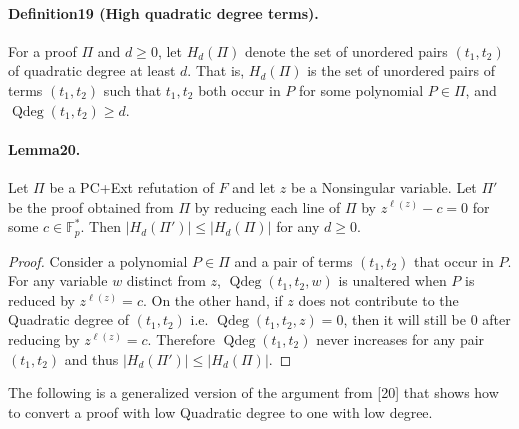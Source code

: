 \documentclass[10pt,a4paper]{article}
\DeclareMathOperator{\Qdeg}{Qdeg}
\begin{document}
\paragraph{Definition19 (High quadratic degree terms).} For a proof $\Pi$ and $d\geq0$, let $H_d(\Pi)$ denote the set of unordered pairs $(t_1,t_2)$ of quadratic degree at least $d$. That is, $H_d(\Pi)$ is the set of unordered pairs of terms $(t_1,t_2)$ such that $t_1,t_2$ both occur in $P$ for some polynomial $P\in\Pi$, and $\Qdeg(t_1,t_2)\geq d$.
\paragraph{Lemma20.} Let $\Pi$ be a PC+Ext refutation of $F$ and let $z$ be a Nonsingular variable. Let $\Pi'$ be the proof obtained from $\Pi$ by reducing each line of $\Pi$ by $z^{\ell(z)}-c=0$ for some $c\in\mathbb F_p^*$. Then $|H_d(\Pi')|\leq|H_d(\Pi)|$ for any $d\geq0$.
\begin{proof}
Consider a polynomial $P\in\Pi$ and a pair of terms $(t_1,t_2)$ that occur in $P$. For any variable $w$ distinct from $z$, $\Qdeg(t_1,t_2,w)$ is unaltered when $P$ is reduced by $z^{\ell(z)}=c$. On the other hand, if $z$ does not contribute to the Quadratic degree of $(t_1,t_2)$ i.e. $\Qdeg(t_1,t_2,z)=0$, then it will still be $0$ after reducing by $z^{\ell(z)}=c$. Therefore $\Qdeg(t_1,t_2)$ never increases for any pair $(t_1,t_2)$ and thus $|H_d(\Pi')|\leq|H_d(\Pi)|$.
\end{proof}
The following is a generalized version of the argument from [20] that shows how to convert a proof with low Quadratic degree to one with low degree.
\end{document}
